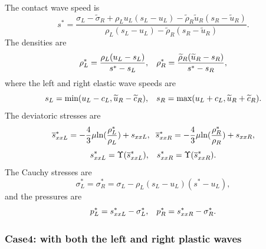 \documentclass{article}
\numberwithin{equation}{section}
\numberwithin{table}{section}
\begin{document}
The contact wave speed is 
\begin{equation}
  s^* = \frac{\sigma_L-\widetilde{\sigma}_R+\rho_L u_L(s_L-u_L)-\widetilde{\rho}_R \widetilde{u}_R(s_R-\widetilde{u}_R)}{\rho_L(s_L-u_L)-\widetilde{\rho}_R(s_R-\widetilde{u}_R)}.
\end{equation}
The densities are
\begin{equation}\label{eq:rhoLs}
  \rho_L^* = \frac{\rho_L(u_L-s_L)}{s^*-s_L}, \hspace{0.3cm}  \rho_R^* = \frac{\widetilde{\rho}_R(\widetilde{u}_R-s_R)}{s^*-s_R},
\end{equation}
where the left and right elastic wave speeds are
	\begin{equation}
	  s_L = \text{min} (u_L-c_L, \widetilde{u}_R-\widetilde{c}_R), \hspace{0.3cm} s_R = \text{max}(u_L+c_L, \widetilde{u}_R+\widetilde{c}_R).
	\end{equation}
	The deviatoric stresses are 
\begin{equation}
  \overline{s}_{xxL}^*=-\frac{4}{3}\mu\text{ln}(\frac{\rho_L^*}{\rho_L})+s_{xxL},\hspace{0.2cm}  \overline{s}_{xxR}^*=-\frac{4}{3}\mu\text{ln}(\frac{\rho_R^*}{\rho_R})+s_{xxR},
\end{equation}
\begin{equation}
  s_{xxL}^* = \Upsilon(\overline{s}_{xxL}^*), \hspace{0.3cm}  s_{xxR}^* = \Upsilon(\overline{s}_{xxR}^*). 
\end{equation}
The Cauchy stresses are
\begin{equation}
  \sigma_L^*=\sigma_R^*=\sigma_L -\rho_L (s_L-u_L)(s^*-u_L),
\end{equation}
and the pressures are 
\begin{equation}
  p_L^* = s_{xxL}^* - \sigma_L^*, \hspace{0.3cm}   p_R^* = s_{xxR}^* - \sigma_R^*.
\end{equation}



\subsubsection{Case4: with both the left and right plastic waves}
\end{document}
